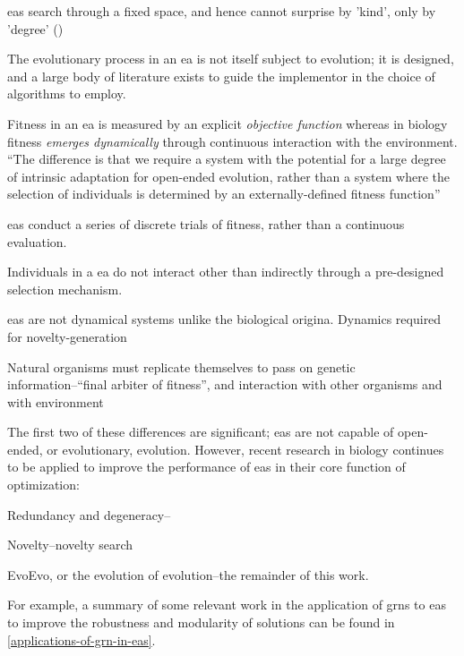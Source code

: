\begin{compactitem}
\item \Glspl{ea} search through a fixed space, and hence cannot surprise by 'kind', only by 'degree' (\eg \parencite{Nellis2014})
\item The evolutionary process in an \gls{ea} is not itself subject to evolution; it is designed, and a large body of literature exists to guide the implementor in the choice of algorithms to employ.
\item Fitness in an \gls{ea} is measured by an explicit \emph{objective function} whereas in biology fitness \emph{emerges dynamically} through continuous interaction with the environment. ``The difference is that we require a system with the potential for a large degree of intrinsic adaptation for open-ended evolution, rather than a system where the selection of individuals is determined by an externally-defined fitness function'' \parencite{Taylor2001}
\item \Glspl{ea} conduct a series of discrete trials of fitness, rather than a continuous evaluation.
\item Individuals in a \gls{ea} do not interact other than indirectly through a pre-designed selection mechanism.
\item \Glspl{ea} are not dynamical systems unlike the biological origina. Dynamics required for novelty-generation \parencite{Nellis2012}
\item Natural organisms must replicate themselves to pass on genetic information--``final arbiter of fitness'', and interaction with other organisms and with environment \parencite{Ofria2004}
\end{compactitem}

The first two of these differences are significant; \glspl{ea} are not capable of open-ended, or evolutionary, evolution. However, recent research in biology continues to be applied to improve the performance of \glspl{ea} in their core function of optimization:
\begin{compactitem}
	\item Redundancy and degeneracy--\eg \parencite{Whitacre:2010qy}
	\item Novelty--\eg novelty search \parencite{Lehman:2008cr}
	\item EvoEvo, or the evolution of evolution--\eg the remainder of this work.
\end{compactitem}

For example, a summary of some relevant work in the application of \glspl{grn} to \glspl{ea} to improve the robustness and modularity of solutions can be found in \ref{applications-of-grn-in-eas}.

